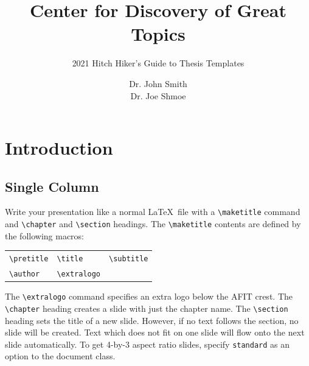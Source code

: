\documentclass{afitdefense}
\title{Center for Discovery of Great Topics}
\subtitle{2021 Hitch Hiker's Guide to Thesis Templates}
\author{Dr. John Smith \\ Dr. Joe Shmoe}
\begin{document}
\maketitle

\chapter{Introduction}

\section{Single Column}

Write your presentation like a normal \LaTeX\ file with a \verb|\maketitle|
command and \verb|\chapter| and \verb|\section| headings. The \verb|\maketitle|
contents are defined by the following macros:
\begin{center}
    \begin{tabular}{l@{\qquad}l@{\qquad}l}
        \verb|\pretitle| &
        \verb|\title| &
        \verb|\subtitle| \\
        \verb|\author| &
        \verb|\extralogo|
    \end{tabular}
\end{center}
The \verb|\extralogo| command specifies an extra logo below the AFIT crest. The
\verb|\chapter| heading creates a slide with just the chapter name. The
\verb|\section| heading sets the title of a new slide. However, if no text
follows the section, no slide will be created. Text which does not fit on one
slide will flow onto the next slide automatically. To get 4-by-3 aspect ratio
slides, specify \verb|standard| as an option to the document class.
\end{document}
